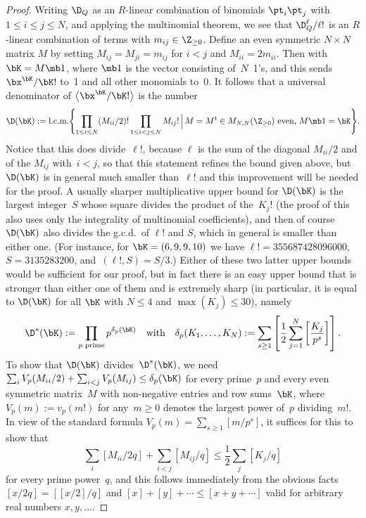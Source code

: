 \begin{proof}
Writing $\D_Q$ as an $R$-linear combination of binomials $\pt_i\pt_j$ with
$1\le i\le j\le N$, and applying the multinomial theorem, we see that
$\D_Q^\ell/\ell!$ is an $R$-linear combination of terms
 with $m_{ij}\in\Z_{\ge0}$. Define an even
symmetric $N\times N$ matrix $M$ by setting $M_{ij}=M_{ji}=m_{ij}$ for $i<j$ and
$M_{ii}=2 m_{ii}$. Then 
with $\bK=M\mb1$, where $\mb1$ is the vector consisting of~$N$~1's, and this
sends $\bx^\bK/\bK!$ to~1 and all other monomials to~0.
It follows that a universal denominator of $\big\langle\bx^\bK/\bK! \big\rangle$ is
the number
\begin{align*}
\D(\bK) := \text{l.c.m.}\Biggl\{ \prod_{1\le i\le N}(M_{ii}/2)!\prod_{1\le i<j\le N}M_{ij}!
 \,\Big|\, \text{$M=M^t\in M_{N,N}(\Z_{\ge0})$ even, $M\mb1=\bK$}\Biggr\} .
\end{align*}
Notice that this does divide~$\ell!$, because $\ell$ is the sum of the diagonal
$M_{ii}/2$ and of the $M_{ij}$ with~${i<j}$, so that this statement refines the bound
given above, but $\D(\bK)$ is in general much smaller than~$\ell!$ and this
improvement will be needed for the proof. A usually sharper multiplicative upper
bound for $\D(\bK)$ is the largest integer~$S$ whose square divides the product of
the~$K_j!$ (the proof of this also uses only the integrality of multinomial
coefficients), and then of course~$\D(\bK)$ also divides the g.c.d.\ of $\ell!$ and
$S$, which in general is smaller than either one. (For instance, for $\bK=(6,9,9,10)$
we have $\ell!=355687428096000$, $S=3135283200$, and~${(\ell!,S)=S/3}$.)
Either of these two latter upper bounds would be sufficient for our proof, but in
fact there is an easy upper bound that is stronger than either one of them and is
extremely sharp (in particular, it
is equal to $\D(\bK)$ for all $\bK$ with $N\le4$ and $\max(K_j)\le 30$), namely
\[
\D^*(\bK) := \prod_{\text{$p$ prime}} p^{\delta_p(\bK)} \quad \text{with} \quad
\delta_p(K_1,\dots,K_N) := \sum_{s\ge1}
\left[\frac12\sum_{j=1}^N\left[\frac{K_j}{p^s}\right]\right] .
\]
To show that $\D(\bK)$ divides~$\D^*(\bK)$, we need
$\sum_iV_p(M_{ii}/2)+\sum_{i<j}V_p(M_{ij})\le\delta_p(\bK)$ for every prime~$p$ and
every even symmetric matrix~$M$ with non-negative entries and row sums~$\bK$, where~${V_p(m):=v_p(m!)}$ for any~$m\ge0$ denotes the largest power of~$p$ dividing~$m!$.
In view of the standard formula $V_p(m)=\sum_{s\ge1}[m/p^s]$, it suffices for this
to show that
\[\sum_i[M_{ii}/2q]+\sum_{i<j}[M_{ij}/q]\le\frac12\sum_j[K_j/q]\]
for every prime power~$q$, and this follows immediately from the obvious facts
$[x/2q]=[[x/2]/q]$ and $[x]+[y]+\cdots \le[x+y+\cdots]$ valid for arbitrary real
numbers $x, y,\dots$.


\end{proof}
